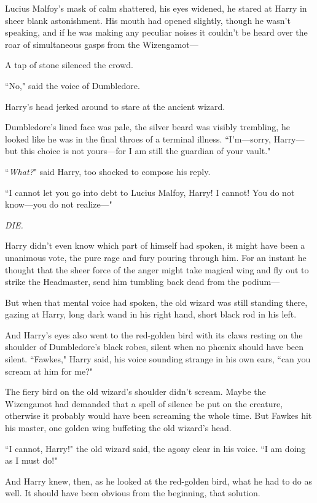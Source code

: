 Lucius Malfoy's mask of calm shattered, his eyes widened, he stared at Harry in sheer blank astonishment. His mouth had opened slightly, though he wasn't speaking, and if he was making any peculiar noises it couldn't be heard over the roar of simultaneous gasps from the Wizengamot—

A tap of stone silenced the crowd.

``No," said the voice of Dumbledore.

Harry's head jerked around to stare at the ancient wizard.

Dumbledore's lined face was pale, the silver beard was visibly trembling, he looked like he was in the final throes of a terminal illness. ``I'm—sorry, Harry—but this choice is not yours—for I am still the guardian of your vault."

``\emph{What?}" said Harry, too shocked to compose his reply.

``I cannot let you go into debt to Lucius Malfoy, Harry! I cannot! You do not know—you do not realize—"

\emph{DIE.}

Harry didn't even know which part of himself had spoken, it might have been a unanimous vote, the pure rage and fury pouring through him. For an instant he thought that the sheer force of the anger might take magical wing and fly out to strike the Headmaster, send him tumbling back dead from the podium—

But when that mental voice had spoken, the old wizard was still standing there, gazing at Harry, long dark wand in his right hand, short black rod in his left.

And Harry's eyes also went to the red-golden bird with its claws resting on the shoulder of Dumbledore's black robes, silent when no phœnix should have been silent. ``Fawkes," Harry said, his voice sounding strange in his own ears, ``can you scream at him for me?"

The fiery bird on the old wizard's shoulder didn't scream. Maybe the Wizengamot had demanded that a spell of silence be put on the creature, otherwise it probably would have been screaming the whole time. But Fawkes hit his master, one golden wing buffeting the old wizard's head.

``I cannot, Harry!" the old wizard said, the agony clear in his voice. ``I am doing as I must do!"

And Harry knew, then, as he looked at the red-golden bird, what he had to do as well. It should have been obvious from the beginning, that solution.

